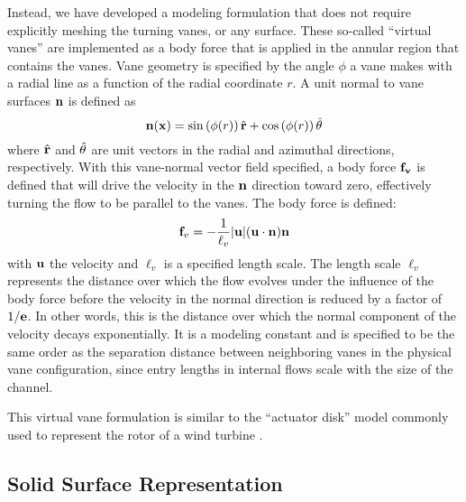 
Instead, we have developed a modeling formulation that does not require
explicitly meshing the turning vanes, or any surface. These so-called
``virtual vanes'' are implemented as a body force that 
is applied in the annular region that contains the vanes. Vane
geometry is specified by the angle $\phi$ a vane makes with a radial
line as a function of the radial coordinate $r$. A unit normal to vane
surfaces ${\bf n}$ is defined as
%
\begin{equation}
 {\bf n}({\bf x}) = \sin \left(\phi(r) \right) \hat{{\bf r}}+ \cos
  \left(\phi(r) \right) \hat{{\bf \theta}} 
\end{equation}
%
where $\hat{{\bf r}}$ and $\hat{{\bf \theta}}$ are unit
vectors in the radial and azimuthal directions, respectively.
With this vane-normal vector field specified, a body force ${\bf f_v}$
is defined
that will drive the velocity in the ${\bf n}$ direction toward zero,
effectively turning the flow to be parallel to the vanes. The body
force is defined:
\begin{equation}
 {\bf f}_v= -\frac{1}{\ell_v}|{\bf u}|({\bf u}\cdot{\bf n}){\bf n}
 \label{eqn:body_force}
\end{equation}
with ${\bf u}$ the velocity and $\ell_v$ is a specified length
scale. The length scale $\ell_v$ represents the distance over which the
flow evolves under the influence of the body force before the
velocity in the normal direction is reduced by a factor of $1/{\bf
e}$. In other words, this is the distance over which the
normal component of the velocity decays exponentially.
It is a modeling constant and is specified to be
the same order as the separation distance between neighboring vanes in
the physical vane configuration, since entry lengths in internal flows
scale with the size of the channel.

This virtual vane formulation is similar to the ``actuator disk'' model
commonly used to represent the rotor of a wind turbine \cite{betz}.


\subsection{Solid Surface Representation}
\label{subsec:solid_surface}

